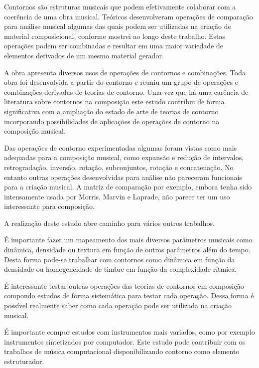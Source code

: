 Contornos são estruturas musicais que podem efetivamente colaborar com
a coerência de uma obra musical. Teóricos desenvolveram operações de
comparação para análise musical algumas das quais podem ser utilizadas
na criação de material composicional, conforme mostrei ao longo deste
trabalho. Estas operações podem ser combinadas e resultar em uma maior
variedade de elementos derivados de um mesmo material gerador.

A obra \obra{} apresenta diversos usos de operações de contornos e
combinações. Toda obra foi desenvolvida a partir do contorno \contpr{}
e reuniu um grupo de operações e combinações derivadas de teorias de
contorno. Uma vez que há uma carência de literatura sobre contornos na
composição este estudo contribui de forma significativa com a
ampliação do estado de arte de teorias de contorno incorporando
possibilidades de aplicações de operações de contorno na composição
musical.


Das operações de contorno experimentadas algumas foram vistas como
mais adequadas para a composição musical, como expansão e redução de
intervalos, retrogradação, inversão, rotação, subconjuntos, rotação e
concatenação. No entanto outras operações desenvolvidas para análise
não pareceram funcionais para a criação musical. A matriz de
comparação por exemplo, embora tenha sido intensamente usada por
Morris, Marvin e Laprade, não parece ter um uso interessante para
composição.

A realização deste estudo abre caminho para vários outros trabalhos.


É importante fazer um mapeamento dos mais diversos parâmetros musicais
como dinâmica, densidade ou textura em função de outros parâmetros
além do tempo. Desta forma pode-se trabalhar com contornos como
dinâmica em função da densidade ou homogeneidade de timbre em função
da complexidade rítmica.


É interessante testar outras operações das teorias de contornos em
composição compondo estudos de forma sistemática para testar cada
operação. Dessa forma é possível realmente saber como cada operação
pode ser utilizada na criação musical.

É importante compor estudos com instrumentos mais variados, como por
exemplo instrumentos sintetizados por computador. Este estudo pode
contribuir com os trabalhos de música computacional disponibilizando
contorno como elemento estruturador.

